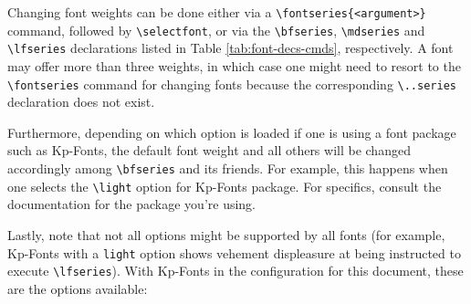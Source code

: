 \documentclass[a4paper,oneside,11pt]{article}
\newcommand\comm[1]{\texttt{\textbackslash#1}}
\newcommand\code[1]{\texttt{#1}}
\begin{document}
Changing font weights can be done either via a \comm{fontseries\{<argument>\}}
command,   followed  by   \comm{selectfont},  or   via  the   \comm{bfseries},
\comm{mdseries}   and    \comm{lfseries}   declarations   listed    in   Table
\ref{tab:font-decs-cmds},  respectively. A  font  may offer  more  than  three
weights,  in which  case one  might need  to resort  to the  \comm{fontseries}
command  for   changing  fonts   because  the   corresponding  \comm{..series}
declaration does not exist.

Furthermore,  depending on  which option  is  loaded if  one is  using a  font
package  such as  Kp-Fonts, the  default font  weight and  all others  will be
changed accordingly  among \comm{bfseries} and its  friends. For example, this
happens when  one selects  the \comm{light}  option for  Kp-Fonts package. For
specifics, consult the documentation for the package you're using.

Lastly,  note that  not  all options  might  be supported  by  all fonts  (for
example,  Kp-Fonts  with  a  \code{light} option  shows  vehement  displeasure
at  being  instructed  to   execute  \comm{lfseries}). With  Kp-Fonts  in  the
configuration for this document, these are the options available:
\end{document}
